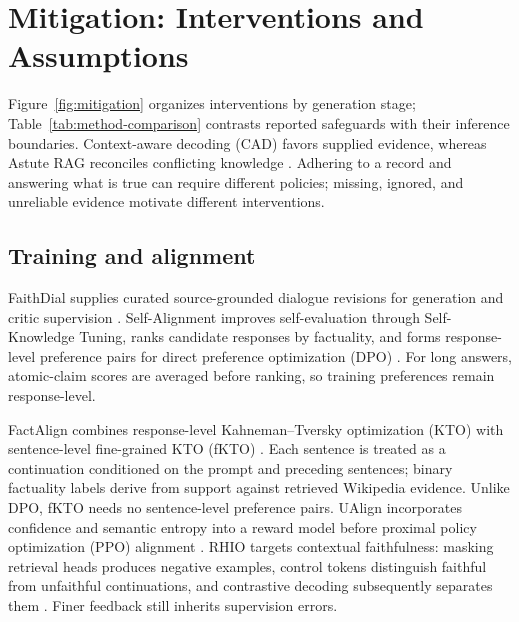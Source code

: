 \section{Mitigation: Interventions and Assumptions}\label{sec:mitigation}

Figure~\ref{fig:mitigation} organizes interventions by generation stage; Table~\ref{tab:method-comparison} contrasts reported safeguards with their inference boundaries. Context-aware decoding (CAD) favors supplied evidence, whereas Astute RAG reconciles conflicting knowledge \citep{shi-etal-2024-trusting,wang-etal-2025-astute}. Adhering to a record and answering what is true can require different policies; missing, ignored, and unreliable evidence motivate different interventions.




\subsection{Training and alignment}

FaithDial supplies curated source-grounded dialogue revisions for generation and critic supervision \citep{dziri-etal-2022-faithdial}. Self-Alignment improves self-evaluation through Self-Knowledge Tuning, ranks candidate responses by factuality, and forms response-level preference pairs for direct preference optimization (DPO) \citep{zhang-etal-2024-self}. For long answers, atomic-claim scores are averaged before ranking, so training preferences remain response-level.

FactAlign combines response-level Kahneman--Tversky optimization (KTO) with sentence-level fine-grained KTO (fKTO) \citep{huang-chen-2024-factalign}. Each sentence is treated as a continuation conditioned on the prompt and preceding sentences; binary factuality labels derive from support against retrieved Wikipedia evidence. Unlike DPO, fKTO needs no sentence-level preference pairs. UAlign incorporates confidence and semantic entropy into a reward model before proximal policy optimization (PPO) alignment \citep{xue-etal-2025-ualign}. RHIO targets contextual faithfulness: masking retrieval heads produces negative examples, control tokens distinguish faithful from unfaithful continuations, and contrastive decoding subsequently separates them \citep{huang-etal-2025-improving}. Finer feedback still inherits supervision errors.

